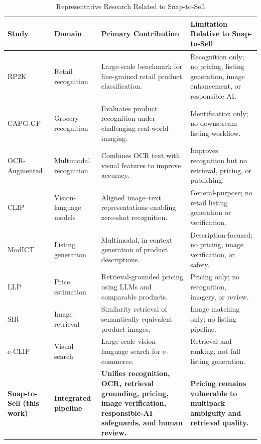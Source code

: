 \documentclass[conference]{IEEEtran}
\begin{document}
\begin{table}[t]
\centering
\caption{Representative Research Related to Snap-to-Sell}
\label{tab:related_work}
\renewcommand{\arraystretch}{1.12}
\setlength{\tabcolsep}{5pt}
\scriptsize
\begin{tabular}{p{2.2cm} p{1.8cm} p{4.2cm} p{5.2cm}}
\hline
\textbf{Study} & \textbf{Domain} & \textbf{Primary Contribution} &
\textbf{Limitation Relative to Snap-to-Sell} \\
\hline
RP2K \cite{peng2020rp2k} & Retail recognition &
Large-scale benchmark for fine-grained retail product classification. &
Recognition only; no pricing, listing generation, image enhancement, or
responsible AI. \\
CAPG-GP \cite{geng2018oneshot} & Grocery recognition &
Evaluates product recognition under challenging real-world imaging. &
Identification only; no downstream listing workflow. \\
OCR-Augmented \cite{ocrfusion2023} & Multimodal recognition &
Combines OCR text with visual features to improve accuracy. &
Improves recognition but no retrieval, pricing, or publishing. \\
CLIP \cite{radford2021clip} & Vision-language models &
Aligned image--text representations enabling zero-shot recognition. &
General-purpose; no retail listing generation or verification. \\
ModICT \cite{li2024modict} & Listing generation &
Multimodal, in-context generation of product descriptions. &
Description-focused; no pricing, image verification, or safety. \\
LLP \cite{llp2025} & Price estimation &
Retrieval-grounded pricing using LLMs and comparable products. &
Pricing only; no recognition, imagery, or review. \\
SIR \cite{sir2020} & Image retrieval &
Similarity retrieval of semantically equivalent product images. &
Image matching only; no listing pipeline. \\
e-CLIP \cite{eclip2022} & Visual search &
Large-scale vision-language search for e-commerce. &
Retrieval and ranking, not full listing generation. \\
\textbf{Snap-to-Sell (this work)} & \textbf{Integrated pipeline} &
\textbf{Unifies recognition, OCR, retrieval grounding, pricing, image
verification, responsible-AI safeguards, and human review.} &
\textbf{Pricing remains vulnerable to multipack ambiguity and retrieval
quality.} \\
\hline
\end{tabular}
\end{table}
\end{document}
